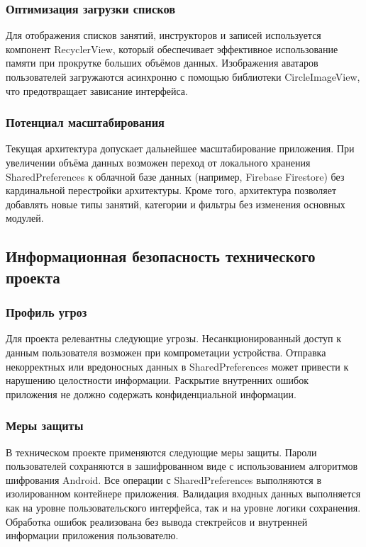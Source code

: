 \subsubsection{Оптимизация загрузки списков}

Для отображения списков занятий, инструкторов и записей используется компонент RecyclerView, который обеспечивает эффективное использование памяти при прокрутке больших объёмов данных. Изображения аватаров пользователей загружаются асинхронно с помощью библиотеки CircleImageView, что предотвращает зависание интерфейса.

\subsubsection{Потенциал масштабирования}

Текущая архитектура допускает дальнейшее масштабирование приложения. При увеличении объёма данных возможен переход от локального хранения SharedPreferences к облачной базе данных (например, Firebase Firestore) без кардинальной перестройки архитектуры. Кроме того, архитектура позволяет добавлять новые типы занятий, категории и фильтры без изменения основных модулей.

\subsection{Информационная безопасность технического проекта}

\subsubsection{Профиль угроз}

Для проекта релевантны следующие угрозы. Несанкционированный доступ к данным пользователя возможен при компрометации устройства. Отправка некорректных или вредоносных данных в SharedPreferences может привести к нарушению целостности информации. Раскрытие внутренних ошибок приложения не должно содержать конфиденциальной информации.

\subsubsection{Меры защиты}

В техническом проекте применяются следующие меры защиты. Пароли пользователей сохраняются в зашифрованном виде с использованием алгоритмов шифрования Android. Все операции с SharedPreferences выполняются в изолированном контейнере приложения. Валидация входных данных выполняется как на уровне пользовательского интерфейса, так и на уровне логики сохранения. Обработка ошибок реализована без вывода стектрейсов и внутренней информации приложения пользователю.

